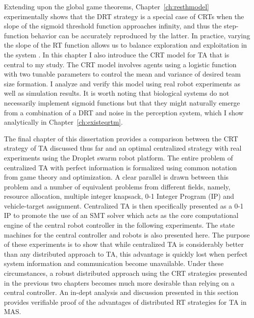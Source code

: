 \documentclass[defaultstyle,12pt]{thesis}
\begin{document}
Extending upon the global game theorems, Chapter~\ref{ch:resthmodel} experimentally shows that the DRT strategy is a special case of CRTs when the slope of the sigmoid threshold function approaches infinity, and thus the step-function behavior can be accurately reproduced by the latter. In practice, varying the slope of the RT function allows us to balance exploration and exploitation in the system \cite{Bonabeau1997}. In this chapter I also introduce the CRT model for TA that is central to my study. The CRT model involves agents using a logistic function with two tunable parameters to control the mean and variance of desired team size formation. I analyze and verify this model using real robot experiments as well as simulation results. It is worth noting that biological systems do not necessarily implement sigmoid functions but that they might naturally emerge from a combination of a DRT and noise in the perception system, which I show analytically in Chapter~\ref{ch:existeqrtm}. 

The final chapter of this dissertation provides a comparison between the CRT strategy of TA discussed thus far and an optimal centralized strategy with real experiments using the Droplet swarm robot platform. The entire problem of centralized TA with perfect information is formalized using common notation from game theory and optimization. A clear parallel is drawn between this problem and a number of equivalent problems from different fields, namely, resource allocation, multiple integer knapsack, 0-1 Integer Program (IP) and vehicle-target assignment. Centralized TA is then specifically presented as a 0-1 IP to promote the use of an SMT solver which acts as the core computational engine of the central robot controller in the following experiments. The state machines for the central controller and robots is also presented here. The purpose of these experiments is to show that while centralized TA is considerably better than any distributed approach to TA, this advantage is quickly lost when perfect system information and communication become unavailable. Under these circumstances, a robust distributed approach using the CRT strategies presented in the previous two chapters becomes much more desirable than relying on a central controller. An in-dept analysis and discussion presented in this section provides verifiable proof of the advantages of distributed RT strategies for TA in MAS.

\end{document}

